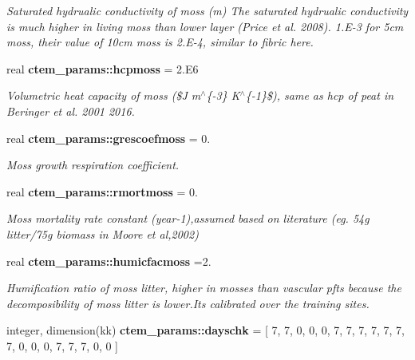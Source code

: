 \begin{DoxyCompactItemize}
\begin{DoxyCompactList}\small\item\em Saturated hydrualic conductivity of moss (m) The saturated hydrualic conductivity is much higher in living moss than lower layer (Price et al. 2008). 1.\+E-\/3 for 5cm moss, their value of 10cm moss is 2.\+E-\/4, similar to fibric here. \end{DoxyCompactList}\item 
\hypertarget{namespacectem__params_a0f0a4776ea1f469d534620de349cc638}{}real {\bfseries ctem\+\_\+params\+::hcpmoss} = 2.\+E6\label{namespacectem__params_a0f0a4776ea1f469d534620de349cc638}

\begin{DoxyCompactList}\small\item\em Volumetric heat capacity of moss (\$\+J m$^\wedge$\{-\/3\} K$^\wedge$\{-\/1\}\$), same as hcp of peat in Beringer et al. 2001 2016. \end{DoxyCompactList}\item 
\hypertarget{namespacectem__params_ab81d40d45c446f0354132a51770591b5}{}real {\bfseries ctem\+\_\+params\+::grescoefmoss} = 0.\label{namespacectem__params_ab81d40d45c446f0354132a51770591b5}

\begin{DoxyCompactList}\small\item\em Moss growth respiration coefficient. \end{DoxyCompactList}\item 
\hypertarget{namespacectem__params_aab2faf4382f8e84aa1fe0ae95f1b3a25}{}real {\bfseries ctem\+\_\+params\+::rmortmoss} = 0.\label{namespacectem__params_aab2faf4382f8e84aa1fe0ae95f1b3a25}

\begin{DoxyCompactList}\small\item\em Moss mortality rate constant (year-\/1),assumed based on literature (eg. 54g litter/75g biomass in Moore et al,2002) \end{DoxyCompactList}\item 
\hypertarget{namespacectem__params_aee7e81fdfd02f048571b235327549b35}{}real {\bfseries ctem\+\_\+params\+::humicfacmoss} =2.\label{namespacectem__params_aee7e81fdfd02f048571b235327549b35}

\begin{DoxyCompactList}\small\item\em Humification ratio of moss litter, higher in mosses than vascular pfts because the decomposibility of moss litter is lower.\+It\textquotesingle{}s calibrated over the training sites. \end{DoxyCompactList}\item 
\hypertarget{namespacectem__params_abae86d324b328aaf473431198d8e3642}{}integer, dimension(kk) {\bfseries ctem\+\_\+params\+::dayschk} = \mbox{[} 7, 7, 0, 0, 0, 7, 7, 7, 7, 7, 7, 7, 0, 0, 0, 7, 7, 7, 0, 0 \mbox{]}\label{namespacectem__params_abae86d324b328aaf473431198d8e3642}


\end{DoxyCompactItemize}
